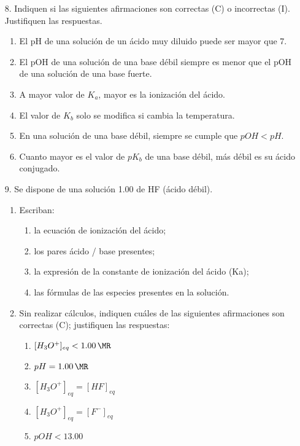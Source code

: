 \documentclass[../practica.root.tex]{subfiles}
\begin{document}
\begin{enumerate}
    \item[8.] Indiquen si las siguientes afirmaciones son correctas (C) o incorrectas (I). Justifiquen las
          respuestas.
          \begin{enumerate}
              \item El pH de una solución de un ácido muy diluido puede ser mayor que 7.
              \item El pOH de una solución de una base débil siempre es menor que el pOH de una solución de una base fuerte.
              \item A mayor valor de $K_a$, mayor es la ionización del ácido.
              \item El valor de $K_b$ solo se modifica si cambia la temperatura.
              \item En una solución de una base débil, siempre se cumple que $pOH < pH$.
              \item Cuanto mayor es el valor de $pK_b$ de una base débil, más débil es su ácido conjugado.
          \end{enumerate}

    \item[9.] Se dispone de una solución \SI{1,00}{\MR} de HF (ácido débil).
          \begin{enumerate}
              \item Escriban:
                    \begin{enumerate}
                        \item la ecuación de ionización del ácido;
                        \item los pares ácido / base presentes;
                        \item la expresión de la constante de ionización del ácido (Ka);
                        \item las fórmulas de las especies presentes en la solución.
                    \end{enumerate}
              \item Sin realizar cálculos, indiquen cuáles de las siguientes afirmaciones son correctas
                    (C); justifiquen las respuestas:
                    \begin{enumerate}
                        \item $[H_3O^+]_{eq} < \SI{1,00}{\MR}$
                        \item $pH = \SI{1,00}{\MR}$
                        \item $[H_3O^+]_{eq} = [HF]_{eq}$
                        \item $[H_3O^+]_{eq} = [F^-]_{eq}$
                        \item $pOH < \num{13,00}$
                    \end{enumerate}
          \end{enumerate}


\end{enumerate}
\end{document}
